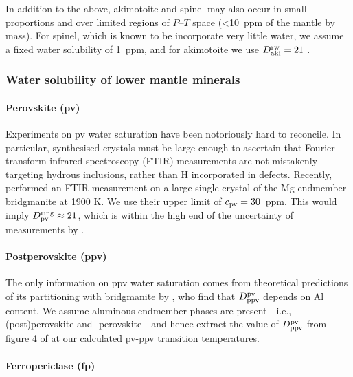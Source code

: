 In addition to the above, akimotoite and spinel may also occur in small proportions and over limited regions of $P$--$T$ space (\textless 10~ppm of the mantle by mass). For spinel, which is known to be incorporate very little water, we assume a fixed water solubility of 1~ppm, and for akimotoite we use $D^{\rm rw}_{\rm aki} = 21$ \citep{keppler_thermodynamics_2006}.

\subsubsection{Water solubility of lower mantle minerals}\label{sec:sat_lm}


\paragraph{Perovskite (pv)}

Experiments on pv water saturation have been notoriously hard to reconcile. In particular, synthesised crystals must be large enough to ascertain that Fourier-transform infrared spectroscopy (FTIR) measurements are not mistakenly targeting hydrous inclusions, rather than H incorporated in defects. Recently, \citet{liu_bridgmanite_2021} performed an FTIR measurement on a large single crystal of the Mg-endmember bridgmanite at 1900 K. We use their upper limit of $c_{\rm pv} = 30$~ppm. This would imply $D^{\rm ring}_{\rm pv} \approx 21$, which is within the high end of the uncertainty of measurements by \citet{inoue_water_2010}. %

\paragraph{Postperovskite (ppv)}

The only information on ppv water saturation comes from theoretical predictions of its partitioning with bridgmanite by \citet{townsend_water_2016}, who find that $D^{\rm pv}_{\rm ppv}$ depends on Al content. We assume aluminous endmember phases are present---i.e., -(post)perovskite and -perovskite---and hence extract the value of $D^{\rm pv}_{\rm ppv}$ from figure 4 of \citet{townsend_water_2016} at our calculated pv-ppv transition temperatures.

\paragraph{Ferropericlase (fp)}

